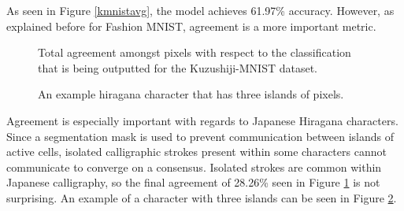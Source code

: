 \documentclass[conference]{IEEEtran}
\begin{document}
As seen in Figure \ref{kmnistavg}, the model achieves 61.97\% accuracy. However, as explained before for Fashion MNIST, agreement is a more important metric.

\begin{figure}[htbp]
\caption{ Total agreement amongst pixels with respect to the classification that is being outputted for the Kuzushiji-MNIST dataset.}
\label{kmnistagree}
\end{figure}

\begin{figure}[htbp]
\caption{ An example hiragana character that has three islands of pixels.}
\label{kmnistislands}
\end{figure}

Agreement is especially important with regards to Japanese Hiragana characters. Since a segmentation mask is used to prevent communication between islands of active cells, isolated calligraphic strokes present within some characters cannot communicate to converge on a consensus. Isolated strokes are common within Japanese calligraphy, so the final agreement of 28.26\% seen in Figure \ref{kmnistagree} is not surprising. An example of a character with three islands can be seen in Figure \ref{kmnistislands}.
\end{document}
